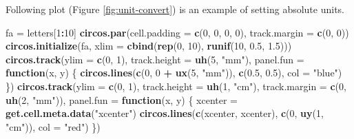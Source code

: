 \documentclass[]{book}
\newenvironment{Shaded}{\begin{snugshade}}{\end{snugshade}}
\newcommand{\KeywordTok}[1]{\textcolor[rgb]{0.13,0.29,0.53}{\textbf{#1}}}
\newcommand{\DataTypeTok}[1]{\textcolor[rgb]{0.13,0.29,0.53}{#1}}
\newcommand{\DecValTok}[1]{\textcolor[rgb]{0.00,0.00,0.81}{#1}}
\newcommand{\FloatTok}[1]{\textcolor[rgb]{0.00,0.00,0.81}{#1}}
\newcommand{\StringTok}[1]{\textcolor[rgb]{0.31,0.60,0.02}{#1}}
\newcommand{\ControlFlowTok}[1]{\textcolor[rgb]{0.13,0.29,0.53}{\textbf{#1}}}
\newcommand{\OperatorTok}[1]{\textcolor[rgb]{0.81,0.36,0.00}{\textbf{#1}}}
\newcommand{\NormalTok}[1]{#1}
\theoremstyle{definition}
\theoremstyle{definition}
\theoremstyle{remark}
\begin{document}
Following plot (Figure \ref{fig:unit-convert}) is an example of setting
absolute units.

\begin{Shaded}
\begin{Highlighting}[]
\NormalTok{fa =}\StringTok{ }\NormalTok{letters[}\DecValTok{1}\OperatorTok{:}\DecValTok{10}\NormalTok{]}
\KeywordTok{circos.par}\NormalTok{(}\DataTypeTok{cell.padding =} \KeywordTok{c}\NormalTok{(}\DecValTok{0}\NormalTok{, }\DecValTok{0}\NormalTok{, }\DecValTok{0}\NormalTok{, }\DecValTok{0}\NormalTok{), }\DataTypeTok{track.margin =} \KeywordTok{c}\NormalTok{(}\DecValTok{0}\NormalTok{, }\DecValTok{0}\NormalTok{))}
\KeywordTok{circos.initialize}\NormalTok{(fa, }\DataTypeTok{xlim =} \KeywordTok{cbind}\NormalTok{(}\KeywordTok{rep}\NormalTok{(}\DecValTok{0}\NormalTok{, }\DecValTok{10}\NormalTok{), }\KeywordTok{runif}\NormalTok{(}\DecValTok{10}\NormalTok{, }\FloatTok{0.5}\NormalTok{, }\FloatTok{1.5}\NormalTok{)))}
\KeywordTok{circos.track}\NormalTok{(}\DataTypeTok{ylim =} \KeywordTok{c}\NormalTok{(}\DecValTok{0}\NormalTok{, }\DecValTok{1}\NormalTok{), }\DataTypeTok{track.height =} \KeywordTok{uh}\NormalTok{(}\DecValTok{5}\NormalTok{, }\StringTok{"mm"}\NormalTok{),}
    \DataTypeTok{panel.fun =} \ControlFlowTok{function}\NormalTok{(x, y) \{}
        \KeywordTok{circos.lines}\NormalTok{(}\KeywordTok{c}\NormalTok{(}\DecValTok{0}\NormalTok{, }\DecValTok{0} \OperatorTok{+}\StringTok{ }\KeywordTok{ux}\NormalTok{(}\DecValTok{5}\NormalTok{, }\StringTok{"mm"}\NormalTok{)), }\KeywordTok{c}\NormalTok{(}\FloatTok{0.5}\NormalTok{, }\FloatTok{0.5}\NormalTok{), }\DataTypeTok{col =} \StringTok{"blue"}\NormalTok{)}
\NormalTok{    \})}
\KeywordTok{circos.track}\NormalTok{(}\DataTypeTok{ylim =} \KeywordTok{c}\NormalTok{(}\DecValTok{0}\NormalTok{, }\DecValTok{1}\NormalTok{), }\DataTypeTok{track.height =} \KeywordTok{uh}\NormalTok{(}\DecValTok{1}\NormalTok{, }\StringTok{"cm"}\NormalTok{),}
    \DataTypeTok{track.margin =} \KeywordTok{c}\NormalTok{(}\DecValTok{0}\NormalTok{, }\KeywordTok{uh}\NormalTok{(}\DecValTok{2}\NormalTok{, }\StringTok{"mm"}\NormalTok{)),}
    \DataTypeTok{panel.fun =} \ControlFlowTok{function}\NormalTok{(x, y) \{}
\NormalTok{        xcenter =}\StringTok{ }\KeywordTok{get.cell.meta.data}\NormalTok{(}\StringTok{"xcenter"}\NormalTok{)}
        \KeywordTok{circos.lines}\NormalTok{(}\KeywordTok{c}\NormalTok{(xcenter, xcenter), }\KeywordTok{c}\NormalTok{(}\DecValTok{0}\NormalTok{, }\KeywordTok{uy}\NormalTok{(}\DecValTok{1}\NormalTok{, }\StringTok{"cm"}\NormalTok{)), }\DataTypeTok{col =} \StringTok{"red"}\NormalTok{)}
\NormalTok{    \})}

\end{Highlighting}
\end{Shaded}
\end{document}
